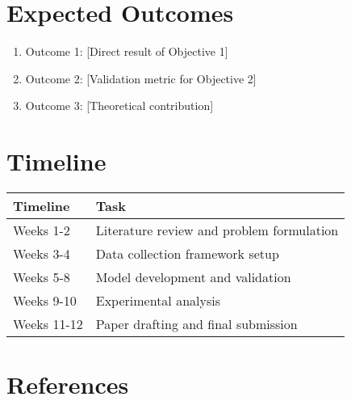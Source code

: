\documentclass[12pt]{article}
\begin{document}
\section{Expected Outcomes}
\begin{enumerate}
    \item Outcome 1: [Direct result of Objective 1]
    \item Outcome 2: [Validation metric for Objective 2]
    \item Outcome 3: [Theoretical contribution]
\end{enumerate}

\section{Timeline}
\begin{tabular}{@{}ll@{}}
\toprule
\textbf{Timeline} & \textbf{Task} \\ 
\midrule
Weeks 1-2 & Literature review and problem formulation \\
Weeks 3-4 & Data collection framework setup \\
Weeks 5-8 & Model development and validation \\
Weeks 9-10 & Experimental analysis \\
Weeks 11-12 & Paper drafting and final submission \\
\bottomrule
\end{tabular}

\section*{References}
\nocite{*}



\hypersetup{
    linkcolor=blue,
    citecolor=red,
    urlcolor=magenta
}
\end{document}
